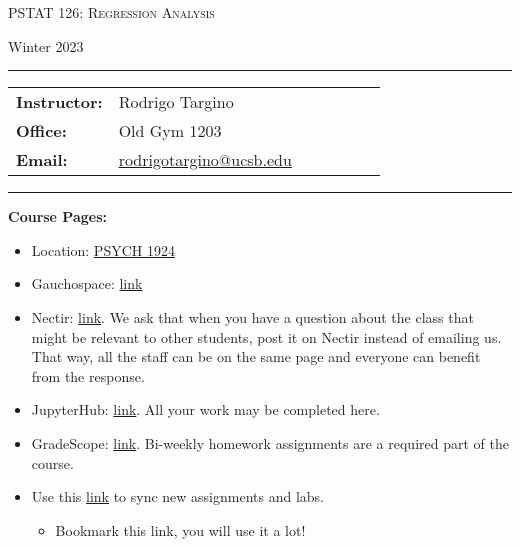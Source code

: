 \documentclass[]{article}
\date{}
\begin{document}
\begin{center}
{\Large \textsc{PSTAT 126: Regression Analysis}}
\end{center}
\begin{center}
Winter 2023
\end{center}

\begin{center}
\rule{6in}{0.4pt}
\begin{minipage}[t]{.75\textwidth}
\begin{tabular}{llcccll}
\textbf{Instructor:} & Rodrigo Targino & \\
\textbf{Office:} & Old Gym 1203 & \\
\textbf{Email:} &
                  \href{mailto:rodrigotargino@ucsb.edu}{rodrigotargino@ucsb.edu}
                                        & & & &  & 
\end{tabular}
\end{minipage}
\rule{6in}{0.4pt}
\end{center}
\vspace{.5cm}
\setlength{\unitlength}{1in}
\renewcommand{\arraystretch}{2}

\noindent\textbf{Course Pages:}

\begin{itemize}
\item Location: \href{https://goo.gl/maps/e1tvM7MZmZ1kFVX68}{PSYCH 1924}
\item Gauchospace: \href{https://gauchospace.ucsb.edu/courses/course/view.php?id=33131}{link}
\item Nectir: \href{https://app.nectir.io/invite/frdqQD}{link}. We ask that when you have a question about the class that might be relevant to other students, post it on Nectir instead of emailing us. That way, all the staff can be on the same page and everyone can benefit from the response.
\item JupyterHub: \href{https://pstat126.lsit.ucsb.edu/}{link}. All your work may be completed here.
\item GradeScope: \href{https://www.gradescope.com}{link}. Bi-weekly homework assignments are a required part of the course.
\item Use this \href{https://pstat126.lsit.ucsb.edu/hub/user-redirect/git-pull?repo=https%3A%2F%2Fgithub.com%2Frtargino%2Fucsb-pstat126&urlpath=rstudio%2F&branch=main}{link} to sync new assignments and labs.%
\begin{itemize}
\item {\color{red} Bookmark this link, you will use it a lot!}
\end{itemize}

\end{itemize}
\end{document}
